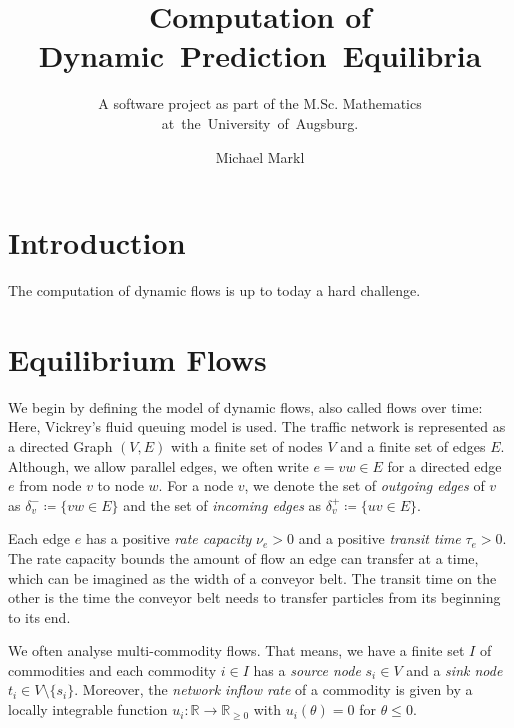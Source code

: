 \documentclass[titlepage]{scrartcl}
\author{Michael Markl}
\title{Computation of Dynamic~Prediction~Equilibria}
\subtitle{A software project as part of the M.Sc. Mathematics at~the~University~of~Augsburg.}
\theoremstyle{definition}
\newcommand{\R}{\mathbb{R}}
\newcommand{\capa}{\nu}
\newcommand{\transit}{\tau}
\newcommand{\outEdges}[1]{\delta^-_{#1}}
\newcommand{\inEdges}[1]{\delta^+_{#1}}
\begin{document}
    \maketitle

    \newpage
    \tableofcontents

    \newpage
    \section{Introduction}

    The computation of dynamic flows is up to today a hard challenge.

    \newpage
    \section{Equilibrium Flows}

    We begin by defining the model of dynamic flows, also called flows over time: Here, Vickrey's fluid queuing model is used. 
    The traffic network is represented as a directed Graph $(V, E)$ with a finite set of nodes $V$ and a finite set of edges $E$.
    Although, we allow parallel edges, we often write $e=vw\in E$ for a directed edge $e$ from node $v$ to node $w$.
    For a node $v$, we denote the set of \emph{outgoing edges} of $v$ as $\outEdges{v}\coloneqq \{ vw \in E \}$ and the set of \emph{incoming edges} as $\inEdges{v} \coloneqq \{ uv \in E \}$.

    Each edge $e$ has a positive \emph{rate capacity} $\capa_e > 0$ and a positive \emph{transit time} $\transit_e > 0$.
    The rate capacity bounds the amount of flow an edge can transfer at a time, which can be imagined as the width of a conveyor belt.
    The transit time on the other is the time the conveyor belt needs to transfer particles from its beginning to its end.

    We often analyse multi-commodity flows.
    That means, we have a finite set $I$ of commodities and each commodity $i\in I$ has a \emph{source node} $s_i\in V$ and a \emph{sink node} $t_i\in V\setminus\{ s_i \}$.
    Moreover, the \emph{network inflow rate} of a commodity is given by a locally integrable function $u_i:\R \rightarrow \R_{\geq 0}$ with $u_i(\theta) = 0$ for $\theta \leq 0$.
\end{document}
